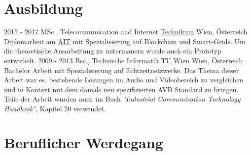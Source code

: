 


 {}{}



\section{Ausbildung}



\begin{twenty} %
	\twentyitem
    	{2015 - 2017}
        {MSc., Telecommunication and Internet}
        {\href{https://www.technikum-wien.at/
}{Technikum}}
        {Wien, Österreich}
        {Diplomarbeit am \href{www.ait.ac.at}{AIT} mit Spezialisierung auf Blockchain und Smart-Grids. Um die theoretische Ausarbeitung zu untermauern wurde auch ein Prototyp entwickelt. }
	\twentyitem
    	{2009 - 2013}
        {Bsc., Technische Informatik}
        {\href{https://www.tuwien.ac.at/}{TU Wien}}
        {Wien, Österreich}
        {Bachelor Arbeit mit Spezialisierung auf Echtzeitnetzwerke. Das Thema dieser Arbeit war es, bestehende Lösungen im Audio und Videobereich zu vergleichen und in Kontext mit dem damals neu spezifizierten AVB Standard zu bringen.  Teile der Arbeit wurden auch im Buch \textit{"Industrial Communication Technology Handbook"},  Kapitel 20 verwendet.}
\end{twenty}

\newpage



\section {Beruflicher Werdegang}


